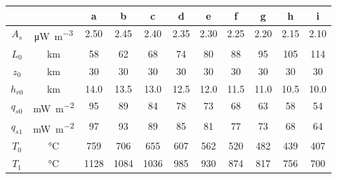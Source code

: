 \begin{tabular}{ccccccccccc}
\toprule
& & a & b & c & d & e & f & g & h & i \\
\midrule
$A_{s}$ & \si{\uW\per\m\cubed} & 2.50 & 2.45 & 2.40 & 2.35 & 2.30 & 2.25 & 2.20 & 2.15 & 2.10 \\
$L_{0}$ & \si{\km} & 58 & 62 & 68 & 74 & 80 & 88 & 95 & 105 & 114 \\
$z_{0}$ & \si{\km} & 30 & 30 & 30 & 30 & 30 & 30 & 30 & 30 & 30 \\
$h_{r0}$ & \si{\km} & 14.0 & 13.5 & 13.0 & 12.5 & 12.0 & 11.5 & 11.0 & 10.5 & 10.0 \\
\midrule
$q_{s0}$ & \si{\mW\per\m\squared} & 95 & 89 & 84 & 78 & 73 & 68 & 63 & 58 & 54 \\
$q_{s1}$ & \si{\mW\per\m\squared} & 97 & 93 & 89 & 85 & 81 & 77 & 73 & 68 & 64 \\
$T_{0}$ & \si{\degreeCelsius} & 759 & 706 & 655 & 607 & 562 & 520 & 482 & 439 & 407 \\
$T_{1}$ & \si{\degreeCelsius} & 1128 & 1084 & 1036 & 985 & 930 & 874 & 817 & 756 & 700 \\
\bottomrule
\end{tabular}
